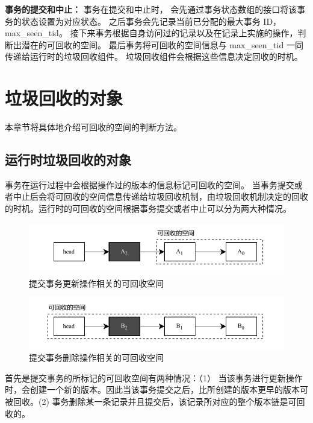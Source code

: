 \textbf{事务的提交和中止：} 事务在提交和中止时，
会先通过事务状态数组的接口将该事务的状态设置为对应状态。
之后事务会先记录当前已分配的最大事务 ID，max\_seen\_tid。
接下来事务根据自身访问过的记录以及在记录上实施的操作，判断出潜在的可回收的空间。
最后事务将可回收的空间信息与 max\_seen\_tid 一同传递给运行时的垃圾回收组件。
垃圾回收组件会根据这些信息决定回收的时机。


\section{垃圾回收的对象}
\label{sec:space}

本章节将具体地介绍可回收的空间的判断方法。

\subsection{运行时垃圾回收的对象}

事务在运行过程中会根据操作过的版本的信息标记可回收的空间。
当事务提交或者中止后会将可回收的空间信息传递给垃圾回收机制，由垃圾回收机制决定的回收的时机。运行时的可回收的空间根据事务提交或者中止可以分为两大种情况。

\begin{figure}
    \centering
    \includegraphics[width=1\linewidth]{figures/gc-a.pdf}
    \caption{提交事务更新操作相关的可回收空间}
    \label{fig:space-commit}
\end{figure}

\begin{figure}
    \centering
    \includegraphics[width=1\linewidth]{figures/gc-b.pdf}
    \caption{提交事务删除操作相关的可回收空间}
    \label{fig:space-commit2}
\end{figure}

首先是提交事务的所标记的可回收空间有两种情况：（1） 当该事务进行更新操作时，会创建一个新的版本。因此当该事务提交之后，比所创建的版本更早的版本可被回收。(2) 事务删除某一条记录并且提交后，该记录所对应的整个版本链是可回收的。

